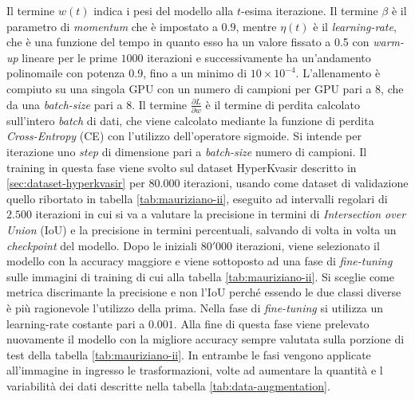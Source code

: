 Il termine $w(t)$ indica i pesi del modello alla $t$-esima
iterazione.
Il termine $\beta$ è il parametro di {\it momentum} che
è impostato a $0.9$, mentre $\eta(t)$ è il {\it learning-rate},
che è una funzione del tempo in quanto esso ha un valore 
fissato a 0.5 con {\it warm-up} lineare per le prime $1000$
iterazioni e successivamente ha un'andamento polinomaile
con potenza $0.9$, fino a un minimo di $10\times 10^{-4}$.
L'allenamento è compiuto su una singola GPU con un numero
di campioni per GPU pari a 8, che da una {\it batch-size}
pari a 8.
Il termine $\displaystyle \frac{\partial L}{\partial w}$ è
il termine di perdita calcolato sull'intero {\it batch} di
dati, che viene calcolato mediante la funzione di perdita
{\it Cross-Entropy} (CE) con l'utilizzo dell'operatore
sigmoide.
Si intende per iterazione uno {\it step} di dimensione
pari a {\it batch-size} numero di campioni.
Il training in questa fase viene svolto sul dataset HyperKvasir
descritto in \ref{sec:dataset-hyperkvasir} per $80.000$ iterazioni,
usando come dataset di validazione quello ribortato in tabella
\ref{tab:mauriziano-ii}, eseguito ad intervalli regolari di
$2.500$ iterazioni in cui si va a valutare la precisione
in termini di {\it Intersection over Union} (IoU) e
la precisione in termini percentuali, salvando
di volta in volta un {\it checkpoint} del modello.
Dopo le iniziali $80'000$ iterazioni, viene selezionato
il modello con la accuracy maggiore e viene sottoposto
ad una fase di {\it fine-tuning} sulle immagini di
training di cui alla tabella \ref{tab:mauriziano-ii}.
Si sceglie come metrica discrimante la precisione e non
l'IoU perché essendo le due classi diverse è più
ragionevole l'utilizzo della prima.
Nella fase di {\it fine-tuning} si utilizza un learning-rate
costante pari a $0.001$.
Alla fine di questa fase viene prelevato nuovamente il modello
con la migliore accuracy sempre valutata sulla porzione di test
della tabella \ref{tab:mauriziano-ii}.
In entrambe le fasi vengono applicate all'immagine in ingresso
le trasformazioni, volte ad aumentare la quantità e l
variabilità dei dati descritte nella tabella
\ref{tab:data-augmentation}.

